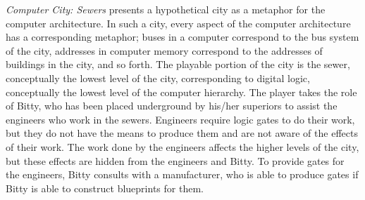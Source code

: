 \textit{Computer City: Sewers} presents a hypothetical city as a metaphor for the computer architecture.  In such a city, every aspect of the computer architecture has a corresponding metaphor; buses in a computer correspond to the bus system of the city, addresses in computer memory correspond to the addresses of buildings in the city, and so forth.  The playable portion of the city is the sewer, conceptually the lowest level of the city, corresponding to digital logic, conceptually the lowest level of the computer hierarchy.  The player takes the role of Bitty, who has been placed underground by his/her superiors to assist the engineers who work in the sewers.  Engineers require logic gates to do their work, but they do not have the means to produce them and are not aware of the effects of their work.  The work done by the engineers affects the higher levels of the city, but these effects are hidden from the engineers and Bitty.  To provide gates for the engineers, Bitty consults with a manufacturer, who is able to produce gates if Bitty is able to construct blueprints for them.